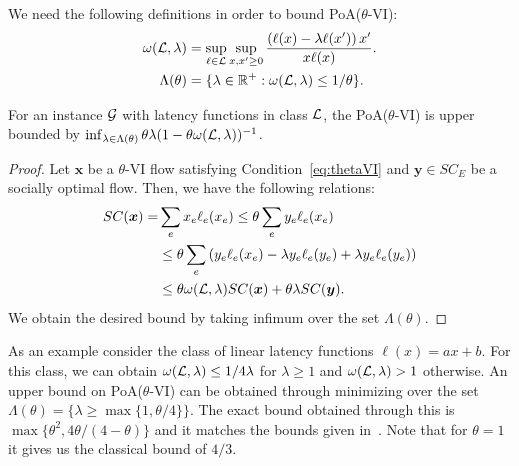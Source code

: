 We need the following definitions in order to bound PoA($\theta$-VI):
\begin{align*}
\omega(\mathcal{L}, \lambda) &= \sup_{\ell \in \mathcal{L}} \sup_{x,x'\geq 0}\frac{\left(\ell(x)-\lambda\ell(x')\right)x'}{x\ell(x)}.\\
\Lambda(\theta) &= \{\lambda\in \mathbb{R}^{+}: \omega(\mathcal{L}, \lambda)\leq  1/\theta \}.
\end{align*}


\begin{lemma}
For an instance $\mathcal{G}$ with latency functions in class $\mathcal{L}$, the PoA($\theta$-VI) is upper bounded by $ \inf_{\lambda \in \Lambda(\theta)} \theta\lambda(1-\theta\omega(\mathcal{L}, \lambda))^{-1}$. 
\end{lemma}
\begin{proof}
Let $\bm{x}$ be a $\theta$-VI flow satisfying Condition~\eqref{eq:thetaVI} and $\bm{y}\in SC_E$ be a socially optimal flow. Then, we have the following relations:
\begin{align*}
SC(\bm{x})= & \sum_e x_e\ell_e(x_e) \leq \theta\sum_e y_e\ell_e(x_e)\\
&\leq \theta\sum_e \left(y_e\ell_e(x_e)-\lambda y_e\ell_e(y_e) + \lambda y_e\ell_e(y_e)\right)\\
&\leq \theta  \omega(\mathcal{L}, \lambda) SC(\bm{x}) + \theta\lambda SC(\bm{y}).
\end{align*}
We obtain the desired bound by taking infimum over the set $\Lambda(\theta)$.
\end{proof}

\begin{example}
As an example consider the class of linear latency functions $\ell(x)= ax+b$.  For this class, we can obtain  $\omega(\mathcal{L},\lambda)\leq 1/4\lambda$ for $\lambda \geq 1$ and  $\omega(\mathcal{L},\lambda)>1$ otherwise. An upper bound on PoA($\theta$-VI) can be obtained through minimizing over the set $\Lambda(\theta)=\{ \lambda \geq \max\{1,\theta/4\}\}$. The exact bound obtained through this is $\max\{\theta^2, 4\theta/(4-\theta)\}$ and it matches the bounds given in~\cite{christodoulou2011performance}. Note that for $\theta=1$ it gives us the classical bound of $4/3$.
\end{example}

